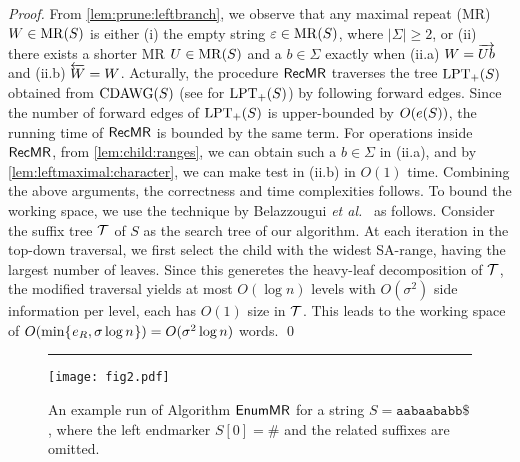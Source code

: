 \begin{proof}
  From \cref{lem:prune:leftbranch}, we observe that any maximal repeat (MR) $W \in \mathrm{MR}(S)$ is either (i) the empty string $\varepsilon \in \mathrm{MR}(S)$, where $|\Sigma|\ge 2$, or (ii) there exists a shorter MR $U \in \mathrm{MR}(S)$ and a $b \in \Sigma$ exactly when (ii.a) $W = \overrightarrow{Ub}$ and (ii.b) $\overleftarrow{W} = W$.
Acturally, the procedure $\textsf{RecMR}$ traverses the tree $\mathrm{LPT}_+(S)$ obtained from $\mathrm{CDAWG}(S)$ (see \cite{inenaga2024computing} for $\mathrm{LPT}_+(S)$) by following forward edges. Since the number of forward edges of  $\mathrm{LPT}_+(S)$ is upper-bounded by $O(e(S))$, the running time of $\textsf{RecMR}$ is bounded by the same term.
For operations inside $\textsf{RecMR}$, from \cref{lem:child:ranges}, we can obtain such a $b \in \Sigma$ in (ii.a), and by \cref{lem:leftmaximal:character}, we can make test in (ii.b) in $O(1)$ time. 
  Combining the above arguments, the correctness and time complexities follows. 
  To bound the working space, we use the technique by Belazzougui \textit{et al.}~\cite[Lemma~4.2]{belazzougui2020linear} as follows. Consider the suffix tree $\mathcal{T}$ of $S$ as the search tree of our algorithm. At each iteration in the top-down traversal, we first select the child with the widest SA-range, having the largest number of leaves. Since this generetes the heavy-leaf decomposition of $\mathcal{T}$, the modified traversal yields at most $O(\log n)$ levels with $O(\sigma^2)$ side information per level, each has $O(1)$ size in $\mathcal{T}$. This leads to the working space of $O(\min\{\kern0.05eme_R, \sigma\log n\kern0.05em\}) = O(\sigma^2\log n)$ words. \qed 
\end{proof}

\begin{figure}[t]
  \centering
  \rule{0.09\textwidth}{0em}
\texttt{[image: fig2.pdf]}
\vspace{.75\baselineskip}
\caption{An example run of Algorithm $\textsf{EnumMR}$ for a string $S = \mathtt{aabaababb\$}$, where the left endmarker $S[0]=\#$ and the related suffixes are omitted. 
}\label{fig:run:example}
\end{figure}


